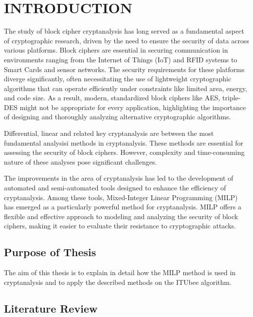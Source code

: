 \chapter{INTRODUCTION}\label{introduction}
The study of block cipher cryptanalysis has long served as a fundamental aspect of cryptographic research, driven by the need to ensure the security of data across various platforms. Block ciphers are essential in securing communication in environments ranging from the Internet of Things (IoT) and RFID systems to Smart Cards and sensor networks. The security requirements for these platforms diverge significantly, often necessitating the use of lightweight cryptographic algorithms that can operate efficiently under constraints like limited area, energy, and code size. As a result, modern, standardized block ciphers like AES, triple-DES might not be appropriate for every application, highlighting the importance of designing and thoroughly analyzing alternative cryptographic algorithms.

Differential, linear and related key cryptanalysis are between the most fundamental analysisi methods in cryptanalysis. These methods are essential for assessing  the security of block ciphers. However, complexity and time-consuming nature of these analyses pose significant challenges.

The improvements in the area of cryptanalysis has led to the development of automated and semi-automated tools designed to  enhance the efficiency of cryptanalysis. Among these tools, Mixed-Integer Linear Programming (MILP) has emerged as a particularly powerful method for cryptanalysis. MILP offers a flexible and effective approach to modeling and analyzing the security of block ciphers, making it easier to evaluate their resistance to cryptographic attacks. 

\section{Purpose of Thesis}\label{purposeofthesis}
The aim of this thesis is to explain in detail how the MILP method is used in cryptanalysis and to apply the described methods on the ITUbee algorithm.
\newline
\section{Literature Review}\label{literaturereview}

